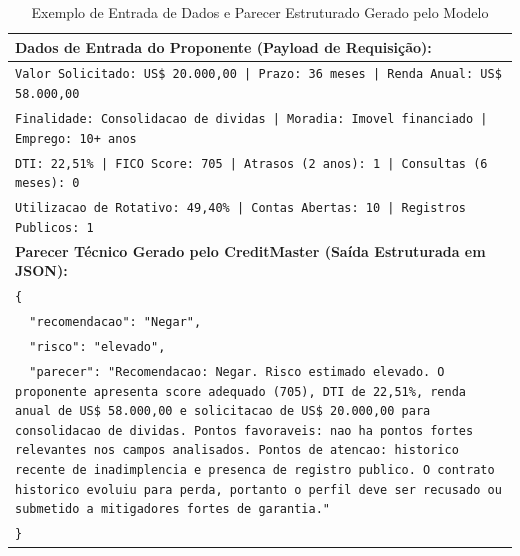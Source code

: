 \begin{table}[htbp]
\centering
\small
\caption{Exemplo de Entrada de Dados e Parecer Estruturado Gerado pelo Modelo}
\label{qua:exemplo_parecer}
\begin{tabular}{|p{}|}
\hline
\textbf{Dados de Entrada do Proponente (Payload de Requisição):} \\
\hline
\texttt{Valor Solicitado: US\$ 20.000,00 | Prazo: 36 meses | Renda Anual: US\$ 58.000,00} \\
\texttt{Finalidade: Consolidacao de dividas | Moradia: Imovel financiado | Emprego: 10+ anos} \\
\texttt{DTI: 22,51\% | FICO Score: 705 | Atrasos (2 anos): 1 | Consultas (6 meses): 0} \\
\texttt{Utilizacao de Rotativo: 49,40\% | Contas Abertas: 10 | Registros Publicos: 1} \\
\hline
\textbf{Parecer Técnico Gerado pelo CreditMaster (Saída Estruturada em JSON):} \\
\hline
\texttt{\{} \\
\texttt{~~"recomendacao": "Negar",} \\
\texttt{~~"risco": "elevado",} \\
\texttt{~~"parecer": "Recomendacao: Negar. Risco estimado elevado. O proponente apresenta score adequado (705), DTI de 22,51\%, renda anual de US\$ 58.000,00 e solicitacao de US\$ 20.000,00 para consolidacao de dividas. Pontos favoraveis: nao ha pontos fortes relevantes nos campos analisados. Pontos de atencao: historico recente de inadimplencia e presenca de registro publico. O contrato historico evoluiu para perda, portanto o perfil deve ser recusado ou submetido a mitigadores fortes de garantia."} \\
\texttt{\}} \\
\hline
\end{tabular}
\end{table}
